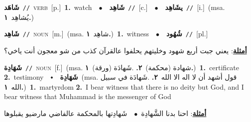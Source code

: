 \documentclass[10pt,a4paper,twoside]{article} %
\begin{document}
\begin{multicols}{2}
{\setlength\topsep{0pt}\textbf{\foreignlanguage{arabic}{شَاهَد}}\ {\color{gray}\texttt{//}\color{black}}\ \textsc{verb}\ [p.]\ \textbf{1.}~watch\ \ $\bullet$\ \ \setlength\topsep{0pt}\textbf{\foreignlanguage{arabic}{شَاهِد}}\ {\color{gray}\texttt{//}\color{black}}\ [c.]\ \ $\bullet$\ \ \setlength\topsep{0pt}\textbf{\foreignlanguage{arabic}{يشَاهِد}}\ {\color{gray}\texttt{//}\color{black}}\ [i.]\ \color{gray}(msa. \foreignlanguage{arabic}{يُشاهِد}~\foreignlanguage{arabic}{\textbf{١.}})\color{black}\ } \vspace{2mm}

{\setlength\topsep{0pt}\textbf{\foreignlanguage{arabic}{شَاهِد}}\ {\color{gray}\texttt{//}\color{black}}\ \textsc{noun}\ [m.]\ \color{gray}(msa. \foreignlanguage{arabic}{شاهِد}~\foreignlanguage{arabic}{\textbf{١.}})\color{black}\ \textbf{1.}~witness\ \ $\bullet$\ \ \setlength\topsep{0pt}\textbf{\foreignlanguage{arabic}{شُهُود}}\ {\color{gray}\texttt{//}\color{black}}\ [pl.]\  \begin{flushright}\color{gray}\foreignlanguage{arabic}{\textbf{\underline{\foreignlanguage{arabic}{أمثلة}}}: يعني جبت أربع شهود وخليتهم يحلفوا عالقرآن كذب من شو معجون أنت ياخي؟}\end{flushright}\color{black}} \vspace{2mm}

{\setlength\topsep{0pt}\textbf{\foreignlanguage{arabic}{شَهَادِة}}\ {\color{gray}\texttt{//}\color{black}}\ \textsc{noun}\ [f.]\ \color{gray}(msa. \foreignlanguage{arabic}{شهادة (محكمة)}~\foreignlanguage{arabic}{\textbf{٢.}}  .\foreignlanguage{arabic}{شَهادَة (ورقة)}~\foreignlanguage{arabic}{\textbf{١.}})\color{black}\ \textbf{1.}~certificate  \textbf{2.}~testimony\ \ $\smblkdiamond$\ \ \setlength\topsep{0pt}\textbf{\foreignlanguage{arabic}{شَهَادِة}}\ \color{gray}(msa. \foreignlanguage{arabic}{قول أشهد أن لا اله الا الله}~\foreignlanguage{arabic}{\textbf{٢.}}  .\foreignlanguage{arabic}{شَهادَة في سبيل الله}~\foreignlanguage{arabic}{\textbf{١.}})\color{black}\ \textbf{1.}~martyrdom  \textbf{2.}~I bear witness that there is no deity but God, and I bear witness that Muhammad is the messenger of God\  \begin{flushright}\color{gray}\foreignlanguage{arabic}{\textbf{\underline{\foreignlanguage{arabic}{أمثلة}}}: احنا بدنا الشَّهادِة\ $\bullet$\ \  شَهادِتها بالمحكمة عالفاضي مارضيو يقبلوها}\end{flushright}\color{black}} \vspace{2mm}


\end{multicols}
\end{document}

